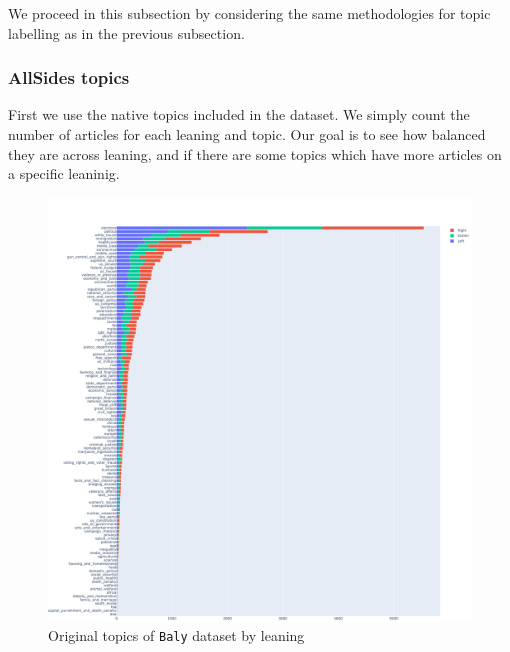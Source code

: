 


We proceed in this subsection by considering the same methodologies for topic labelling as in the previous subsection.

\subsubsection{\statusgreen AllSides topics}

First we use the native topics included in the dataset. We simply count the number of articles for each leaning and topic. Our goal is to see how balanced they are across leaning, and if there are some topics which have more articles on a specific leaninig.

\begin{figure}[!htbp]
    \centering
    \includegraphics[width=\linewidth]{figures/baly_original_topics_by_leaning.pdf}
    \caption{Original topics of \texttt{Baly} dataset by leaning}
    \label{fig:baly_original_topics_by_leaning}
\end{figure}

